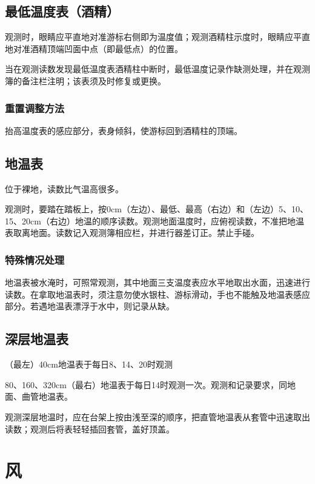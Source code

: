 ﻿\documentclass[UTF8,11pt]{ctexbook}%
\begin{document}
\subsection{最低温度表（酒精）}

观测时，眼睛应平直地对准游标右侧即为温度值；观测酒精柱示度时，眼睛应平直地对准酒精顶端凹面中点（即最低点）的位置。

当在观测读数发现最低温度表酒精柱中断时，最低温度记录作缺测处理，并在观测簿的备注栏注明；该表须及时修复或更换。 

\subsubsection{重置调整方法}

抬高温度表的感应部分，表身倾斜，使游标回到酒精柱的顶端。 

\subsection{地温表}

位于裸地，读数比气温高很多。

观测时，要踏在踏板上，按0cm（左边）、最低、最高（右边）和（左边）5、10、15、20cm（右边）地温的顺序读数。观测地面温度时，应俯视读数，不准把地温表取离地面。读数记入观测簿相应栏，并进行器差订正。禁止手碰。

\subsubsection{特殊情况处理}

地温表被水淹时，可照常观测，其中地面三支温度表应水平地取出水面，迅速进行读数。在拿取地温表时，须注意勿使水银柱、游标滑动，手也不能触及地温表感应部分。若遇地温表漂浮于水中，则记录从缺。 

\subsection{深层地温表}

（最左）40cm地温表于每日8、14、20时观测

80、160、320cm（最右）地温表于每日14时观测一次。观测和记录要求，同地面、曲管地温表。

观测深层地温时，应在台架上按由浅至深的顺序，把直管地温表从套管中迅速取出读数；观测后将表轻轻插回套管，盖好顶盖。

\section{风}
\end{document}
